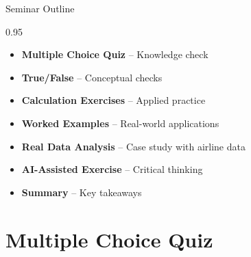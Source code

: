 \documentclass[9pt, aspectratio=169, t]{beamer}
\subtitle{Seminar 4: SARIMA Models}
\begin{document}
{
\begin{frame}
    \titlepage
\end{frame}
}


\begin{frame}{Seminar Outline}
    \begin{cminipage}{0.95\textwidth}
    \begin{itemize}
        \item \textbf{Multiple Choice Quiz} -- Knowledge check
        \vspace{0.15cm}
        \item \textbf{True/False} -- Conceptual checks
        \vspace{0.15cm}
        \item \textbf{Calculation Exercises} -- Applied practice
        \vspace{0.15cm}
        \item \textbf{Worked Examples} -- Real-world applications
        \vspace{0.15cm}
        \item \textbf{Real Data Analysis} -- Case study with airline data
        \vspace{0.15cm}
        \item \textbf{AI-Assisted Exercise} -- Critical thinking
        \vspace{0.15cm}
        \item \textbf{Summary} -- Key takeaways
    \end{itemize}
    \end{cminipage}
\end{frame}

\section{Multiple Choice Quiz}
\end{document}
